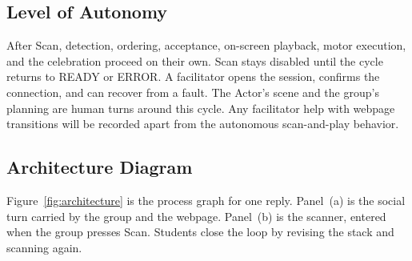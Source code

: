 \documentclass[conference,12pt,letterpaper]{IEEEtran}
\begin{document}
\subsection{Level of Autonomy}
After Scan, detection, ordering, acceptance, on-screen playback, motor execution, and the celebration proceed on their own. Scan stays disabled until the cycle returns to READY or ERROR. A facilitator opens the session, confirms the connection, and can recover from a fault. The Actor's scene and the group's planning are human turns around this cycle. Any facilitator help with webpage transitions will be recorded apart from the autonomous scan-and-play behavior.

\subsection{Architecture Diagram}
Figure~\ref{fig:architecture} is the process graph for one reply. Panel~(a) is the social turn carried by the group and the webpage. Panel~(b) is the scanner, entered when the group presses Scan. Students close the loop by revising the stack and scanning again.
\end{document}
